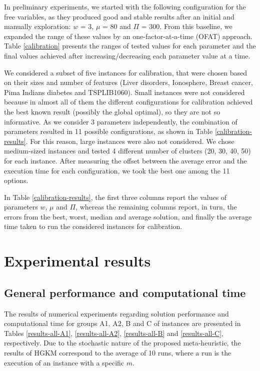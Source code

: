 In preliminary experiments, we started with the following configuration for the free variables, as they produced good and stable results after an initial and manually exploration: $w$ = 3, $\mu$ = 80 and $\Pi$ = 300. From this baseline, we expanded the range of these values by an one-factor-at-a-time (OFAT) approach. Table \ref{calibration} presents the ranges of tested values for each parameter and the final values achieved after increasing/decreasing each parameter value at a time.



We considered a subset of five instances for calibration, that were chosen based on their sizes and number of features (Liver disorders, Ionosphere, Breast cancer, Pima Indians diabetes and TSPLIB1060). Small instances were not considered because in almost all of them the different configurations for calibration achieved the best known result (possibly the global optimal), so they are not so informative. As we consider 3 parameters independently, the combination of parameters resulted in 11 possible configurations, as shown in Table \ref{calibration-results}. For this reason, large instances were also not considered.
We chose medium-sized instances and tested 4 different number of clusters (20, 30, 40, 50) for each instance. After measuring the offset between the average error and the execution time for each configuration, we took the best one among the 11 options.

In Table \ref{calibration-results}, the first three columns report the values of parameters $w$, $\mu$ and $\Pi$, whereas the remaining columns report, in turn, the errors from the best, worst, median and average solution, and finally the average time taken to run the considered instances for calibration.



\section{Experimental results}
\label{sec:results}

\subsection{General performance and computational time}
\label{sec:performance}
The results of numerical experiments regarding solution performance and computational time for groups A1, A2, B and C of instances are presented in Tables \ref{results-all-A1}, \ref{results-all-A2}, \ref{results-all-B} and \ref{results-all-C}, respectively. Due to the stochastic nature of the proposed meta-heuristic, the results of HGKM correspond to the average of 10 runs, where a run is the execution of an instance with a specific $m$. 

